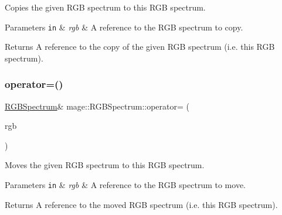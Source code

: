 Copies the given R\+GB spectrum to this R\+GB spectrum.


\begin{DoxyParams}[1]{Parameters}
\mbox{\tt in}  & {\em rgb} & A reference to the R\+GB spectrum to copy. \\
\hline
\end{DoxyParams}
\begin{DoxyReturn}{Returns}
A reference to the copy of the given R\+GB spectrum (i.\+e. this R\+GB spectrum). 
\end{DoxyReturn}
\hypertarget{structmage_1_1_r_g_b_spectrum_a3a487cd0fcb35395c0979552dc551829}{}\label{structmage_1_1_r_g_b_spectrum_a3a487cd0fcb35395c0979552dc551829} 
\subsubsection{\texorpdfstring{operator=()}{operator=()}\hspace{0.1cm}{\footnotesize\ttfamily [2/2]}}
{\footnotesize\ttfamily \hyperlink{structmage_1_1_r_g_b_spectrum}{R\+G\+B\+Spectrum}\& mage\+::\+R\+G\+B\+Spectrum\+::operator= (\begin{DoxyParamCaption}\item[{\hyperlink{structmage_1_1_r_g_b_spectrum}{R\+G\+B\+Spectrum} \&\&}]{rgb }\end{DoxyParamCaption})\hspace{0.3cm}{\ttfamily [default]}}

Moves the given R\+GB spectrum to this R\+GB spectrum.


\begin{DoxyParams}[1]{Parameters}
\mbox{\tt in}  & {\em rgb} & A reference to the R\+GB spectrum to move. \\
\hline
\end{DoxyParams}
\begin{DoxyReturn}{Returns}
A reference to the moved R\+GB spectrum (i.\+e. this R\+GB spectrum). 
\end{DoxyReturn}

